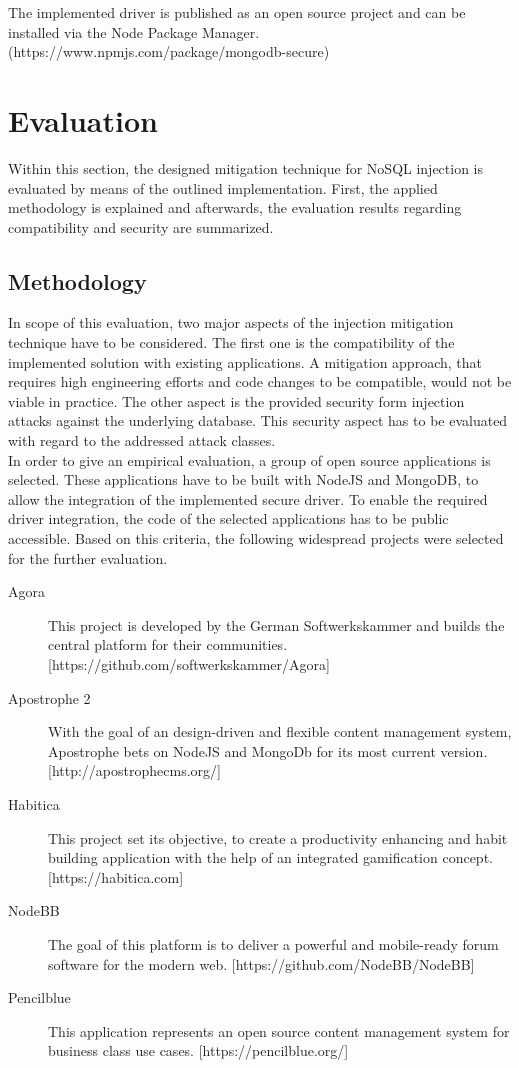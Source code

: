 The implemented driver is published as an open source project and can be installed via the Node Package Manager. (https://www.npmjs.com/package/mongodb-secure)


\section{Evaluation}
\label{sec:evaluation}
Within this section, the designed mitigation technique for NoSQL injection is evaluated by means of the outlined implementation. First, the applied methodology is explained and afterwards, the evaluation results regarding compatibility and security are summarized.

\subsection{Methodology}
In scope of this evaluation, two major aspects of the injection mitigation technique have to be considered. The first one is the compatibility of the implemented solution with existing applications. A mitigation approach, that requires high engineering efforts and code changes to be compatible, would not be viable in practice. The other aspect is the provided security form injection attacks against the underlying database. This security aspect has to be evaluated with regard to the addressed attack classes. \\

In order to give an empirical evaluation, a group of open source applications is selected. These applications have to be built with NodeJS and MongoDB, to allow the integration of the implemented secure driver. To enable the required driver integration, the code of the selected applications has to be public accessible. Based on this criteria, the following widespread projects were selected for the further evaluation.

\begin{description}
\item [Agora] This project is developed by the German Softwerkskammer and builds the central platform for their communities. [https://github.com/softwerkskammer/Agora]
\item [Apostrophe 2] With the goal of an design-driven and flexible content management system, Apostrophe bets on NodeJS and MongoDb for its most current version. [http://apostrophecms.org/]
\item [Habitica] This project set its objective, to create a productivity enhancing and habit building application with the help of an integrated gamification concept. [https://habitica.com] 
\item [NodeBB] The goal of this platform is to deliver a powerful and mobile-ready forum software for the modern web. [https://github.com/NodeBB/NodeBB]
\item [Pencilblue] This application represents an open source content management system for business class use cases. [https://pencilblue.org/]
\end{description}

